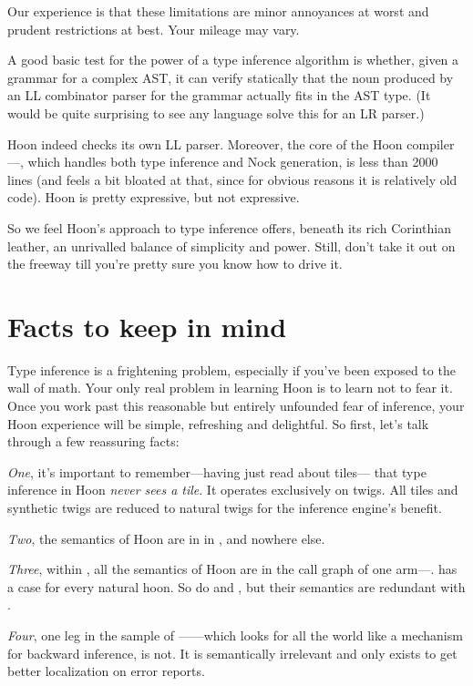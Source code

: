 Our experience is that these limitations are minor annoyances at
worst and prudent restrictions at best.  Your mileage may vary.

A good basic test for the power of a type inference algorithm is
whether, given a grammar for a complex AST, it can verify
statically that the noun produced by an LL combinator parser for
the grammar actually fits in the AST type.  (It would be quite
surprising to see any language solve this for an LR parser.)

Hoon indeed checks its own LL parser.  Moreover, the core of
the Hoon compiler---, which handles both type inference and 
Nock generation, is less than 2000 lines (and feels a bit bloated
at that, since for obvious reasons it is relatively old code).
Hoon is pretty expressive, but not  expressive.  

So we feel Hoon's approach to type inference offers, beneath its
rich Corinthian leather, an unrivalled balance of simplicity and
power.  Still, don't take it out on the freeway till you're
pretty sure you know how to drive it.

\section{Facts to keep in mind}

Type inference is a frightening problem, especially if you've
been exposed to the wall of math.  Your only real problem in
learning Hoon is to learn not to fear it.  Once you work past
this reasonable but entirely unfounded fear of inference, your
Hoon experience will be simple, refreshing and delightful.  So
first, let's talk through a few reassuring facts:

\emph{One}, it's important to remember---having just read about tiles---
that type inference in Hoon \emph{never sees a tile}.  It operates
exclusively on twigs.  All tiles and synthetic twigs are reduced
to natural twigs for the inference engine's benefit.

\emph{Two}, the semantics of Hoon are in  in , and 
nowhere else.

\emph{Three}, within , all the semantics of Hoon are in the call
graph of one arm---.   has a case for every
natural hoon.  So do  and , but their semantics
are redundant with .

\emph{Four}, one leg in the sample of ------which looks
for all the world like a mechanism for backward inference, is
not.  It is semantically irrelevant and only exists to get better
localization on error reports.

